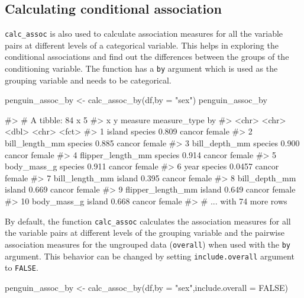 \hypertarget{calculating-conditional-association}{%
\subsection{Calculating conditional
association}\label{calculating-conditional-association}}

\texttt{calc\_assoc} is also used to calculate association measures for
all the variable pairs at different levels of a categorical variable.
This helps in exploring the conditional associations and find out the
differences between the groups of the conditioning variable. The
function has a \texttt{by} argument which is used as the grouping
variable and needs to be categorical.

\begin{Schunk}
\begin{Sinput}
penguin_assoc_by <- calc_assoc_by(df,by = "sex")
penguin_assoc_by
\end{Sinput}
\begin{Soutput}
#> # A tibble: 84 x 5
#>    x                 y       measure measure_type by    
#>    <chr>             <chr>     <dbl> <chr>        <fct> 
#>  1 island            species  0.809  cancor       female
#>  2 bill_length_mm    species  0.885  cancor       female
#>  3 bill_depth_mm     species  0.900  cancor       female
#>  4 flipper_length_mm species  0.914  cancor       female
#>  5 body_mass_g       species  0.911  cancor       female
#>  6 year              species  0.0457 cancor       female
#>  7 bill_length_mm    island   0.395  cancor       female
#>  8 bill_depth_mm     island   0.669  cancor       female
#>  9 flipper_length_mm island   0.649  cancor       female
#> 10 body_mass_g       island   0.668  cancor       female
#> # ... with 74 more rows
\end{Soutput}
\end{Schunk}

By default, the function \texttt{calc\_assoc} calculates the association
measures for all the variable pairs at different levels of the grouping
variable and the pairwise association measures for the ungrouped data
(\texttt{overall}) when used with the \texttt{by} argument. This
behavior can be changed by setting \texttt{include.overall} argument to
\texttt{FALSE}.

\begin{Schunk}
\begin{Sinput}
penguin_assoc_by <- calc_assoc_by(df,by = "sex",include.overall = FALSE)
\end{Sinput}
\end{Schunk}

